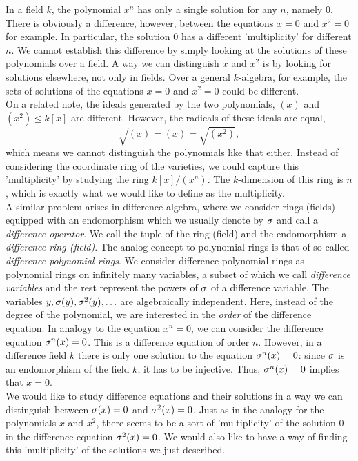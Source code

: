 In a field $k$, the polynomial $x^n$ has only a single solution for any $n$, namely $0$. 
There is obviously a difference, however, between the equations $x = 0$ and $x^2 = 0$ for example. In particular, the solution $0$ has a different 'multiplicity' for different $n$.
We cannot establish this difference by simply looking at the solutions of these polynomials over a field.
  A way we can distinguish $x$ and $x^2$ is by looking for solutions elsewhere, not only in fields.
Over a general $k$-algebra, for example, the sets of solutions of the equations $x = 0$ and $x^2 = 0$ could be different. \\


On a related note, the ideals generated by the two polynomials, $(x)$ and $(x^2) \unlhd k[x]$ are different. However, the radicals of these ideals are equal,
$$ \sqrt{ (x) } = (x) = \sqrt{(x^2)}, $$ which means we cannot distinguish the polynomials like that either.
Instead of considering the coordinate ring of the varieties, we could capture this 'multiplicity' by studying the ring $k[x]/(x^n)$.
The $k$-dimension of this ring is $n$, which is exactly what we would like to define as the multiplicity. \\

A similar problem arises in difference algebra, where we consider rings (fields) equipped with an endomorphism which we usually denote by $\sigma$ and call a \emph{difference operator}. We call the tuple of the ring (field) and the endomorphism a \emph{difference ring (field)}.
The analog concept to polynomial rings is that of so-called \emph{difference polynomial rings}. We consider difference polynomial rings as polynomial rings on infinitely many variables, a subset of which we call \emph{difference variables} and the rest represent the powers of $\sigma$ of a difference variable. The variables $y, \sigma(y), \sigma^2(y), \ldots$ are algebraically independent.
Here, instead of the degree of the polynomial, we are interested in the \emph{order} of the difference equation.
In analogy to the equation $x^n = 0$, we can consider the difference equation $\sigma^n(x) = 0$. This is a difference equation of order $n$.
However, in a difference field $k$ there is only one solution to the equation $\sigma^n(x) = 0$: since $\sigma$ is an endomorphism of the field $k$,
it has to be injective. Thus, $\sigma^n(x) = 0$ implies that $x = 0$. \\

We would like to study difference equations and their solutions in a way we can distinguish between $\sigma(x) = 0$ and $\sigma^2(x) = 0$. Just as in the analogy for the polynomials $x$ and $x^2$,
there seems to be a sort of 'multiplicity' of the solution $0$ in the difference equation $\sigma^2(x) = 0$. We would also like to have a way of finding this 'multiplicity' of the solutions we just described.

